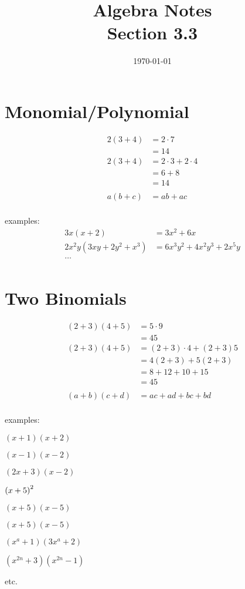 \documentclass[letterpaper, landscape]{exam}
\title{Algebra Notes \\ Section 3.3 }
\author{}
\date{\today}
\begin{document}
  \maketitle

  \section{Monomial/Polynomial}

  \begin{align*}
    2(3 + 4) & = 2 \cdot 7 \\
             & = 14 \\
    2(3 + 4) & = 2 \cdot 3 + 2 \cdot 4 \\
             & = 6 + 8 \\
             & = 14 \\
             \\
    a(b + c) & = ab + ac \\
  \end{align*}

  examples:
  \begin{align*}
    3x(x + 2)               & = 3x^2 + 6x \\
    2x^2y(3xy + 2y^2 + x^3) & = 6x^3y^2 + 4x^2y^3 + 2x^5y \\
    \ldots \\
  \end{align*}

  \section{Two Binomials}

  \begin{align*}
    (2 + 3)(4 + 5) & = 5 \cdot 9 \\
                   & = 45 \\
    (2 + 3)(4 + 5) & = (2 + 3) \cdot 4 + (2 + 3) 5 \\
                   & = 4(2 + 3) + 5(2 + 3) \\
                   & = 8 + 12 + 10 + 15 \\
                   & = 45 \\
                   \\
    (a + b)(c + d) & = ac + ad + bc + bd \\
  \end{align*}

  examples:
  \begin{itemize*}
    \item $(x + 1)(x + 2)$
    \item $(x - 1)(x - 2)$
    \item $(2x + 3)(x - 2)$
    \item $\del{x + 5}^2$
    \item $(x + 5)(x - 5)$
    \item $(x + 5)(x - 5)$
    \item $(x^a + 1)(3x^a + 2)$
    \item $(x^{2n} + 3)(x^{2n} - 1)$
    \item etc.
  \end{itemize*}
\end{document}
